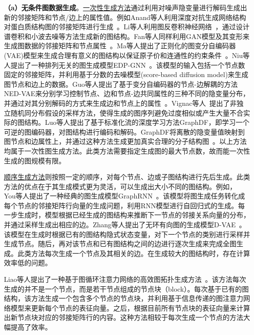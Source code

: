\textbf{（a）无条件图数据生成}。\underline{一次性生成方法}通过利用对噪声隐变量进行解码生成出新的邻接矩阵和节点/边上的属性值。例如Anand等人利用深度对抗生成网络结构对蛋白质结构图的邻接矩阵进行生成~\cite{anand2018generative}。Li等人利用图反卷积神经网络~\cite{li2021deconvolutional}，通过设计谱卷积和小波去噪等方法生成新的图结构。Fan等人同样利用GAN模型及其变形来生成图数据的邻接矩阵和节点属性~\cite{fan2019labeled}。Ma等人提出了正则化的图变分自编码器(VAE)模型来生成合理有意义的图结构以保证原子价和连通性的约束条件~\cite{ma2018constrained}。Niu等人提出了一种排列无关的图生成模型EDP-GNN~\cite{niu2020permutation}。该模型的输入包括一个节点数固定的邻接矩阵，并利用基于分数的去噪模型(score-based diffusion model)来生成图节点和边上的数据。Guo等人提出了基于变分自编码器的节点-边解耦的方法NED-VAE来分别学习控制节点、边和节点-边共同属性的三种不同的隐变量分布，并通过对其分别解码的方式来生成边和节点上的属性~\cite{guo2020interpretable}。Vignac等人~\cite{vignac2021top}提出了非独立随机同分布假设的采样方法，使得生成的图序列避免过度相似或产生大量不合实际的图结构。Luo等人提出了基于标准化流的深度学习方法GraphDF，即学习一个可逆的图编码器，对图结构进行编码和解码。GraphDF将离散的隐变量值映射到图节点和边属性上，并通过这种方法生成更加真实合理的分子结构图~\cite{luo2021graphdf}。以上方法均属于一次性图生成方法。此类方法需要指定生成图的最大节点数，故而能一次性生成的图规模有限。

\underline{顺序生成方法}则按照一定的顺序，对每个节点、边或子图结构进行先后生成。此类方法的优点在于其生成模式更为灵活，可以生成出大小不同的图结构。例如，%
You等人提出了一种经典的图生成模型GraphRNN~\cite{you2018graphrnn}。该模型将图生成任务转化成每个节点的邻接矩阵行向量的生成问题，利用RNN模型进行自回归式的生成。每一步生成时，模型根据已经生成的图结构来推断下一节点的邻接关系向量的分布，并通过采样生成出相应的边。Zhang等人提出了无环有向图的生成模型D-VAE~\cite{zhang2019d}。该模型在生成时根据已有的图结构隐式状态变量，对下一个节点的类别进行采样并生成节点。随后，再对该节点和已有图结构之间的边进行逐次生成来完成全图生成。此类方法每次生成一个节点及其相关的边。在生成较大的图结构时，存在计算效率低的问题。

Liao等人提出了一种基于图循环注意力网络的高效图拓扑生成方法~\cite{liao2019efficient}。该方法每次生成的并不是一个节点，而是若干节点组成的节点块（block）。每次基于已有的图结构，该方法生成一个包含多个节点的节点块，并利用基于信息传递的图注意力网络模型来更新每个节点的表征向量。之后，根据目前所有节点块的表征向量来计算出新节点块对应的邻接矩阵行的内容。这种方法相较于每次生成一个节点的方法大幅提高了效率。

